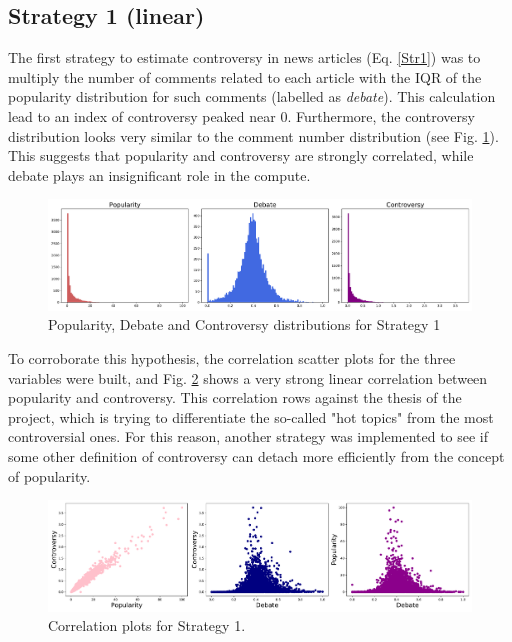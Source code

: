 \subsection{Strategy 1 (linear)}
The first strategy to estimate controversy in news articles (Eq. \ref{Str1}) was to multiply the number of comments related to each article with the IQR of the popularity distribution for such comments (labelled as \textit{debate}). This calculation lead to an index of controversy peaked near 0. Furthermore, the controversy distribution looks very similar to the comment number distribution (see Fig. \ref{Str1Dist}). This suggests that popularity and controversy are strongly correlated, while debate plays an insignificant role in the compute. 

\begin{figure}[tb]
\centering
\includegraphics[width=\tw]{Pictures/Strat1Dist.pdf}
\caption{Popularity, Debate and Controversy distributions for Strategy 1}
\label{Str1Dist}
\end{figure}

To corroborate this hypothesis, the correlation scatter plots for the three variables were built, and Fig. \ref{Str1Corr} shows a very strong linear correlation between popularity and controversy. This correlation rows against the thesis of the project, which is trying to differentiate the so-called "hot topics" from the most controversial ones. For this reason, another strategy was implemented to see if some other definition of controversy can detach more efficiently from the concept of popularity.

\begin{figure}[tb]
\centering
\includegraphics[width=\tw]{Pictures/Strat1Corr.pdf}
\caption{Correlation plots for Strategy 1.}
\label{Str1Corr}
\end{figure}

